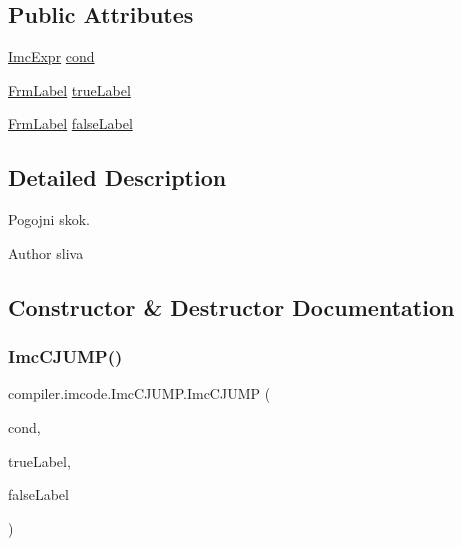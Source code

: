 \subsection*{Public Attributes}
\begin{DoxyCompactItemize}
\item 
\hyperlink{classcompiler_1_1imcode_1_1_imc_expr}{Imc\+Expr} \hyperlink{classcompiler_1_1imcode_1_1_imc_c_j_u_m_p_aa060cb5ff22920eee2e7a16b9252e238}{cond}
\item 
\hyperlink{classcompiler_1_1frames_1_1_frm_label}{Frm\+Label} \hyperlink{classcompiler_1_1imcode_1_1_imc_c_j_u_m_p_afe718affa055b0d5fa58cb5011024adf}{true\+Label}
\item 
\hyperlink{classcompiler_1_1frames_1_1_frm_label}{Frm\+Label} \hyperlink{classcompiler_1_1imcode_1_1_imc_c_j_u_m_p_acf48b9439d6099fa19f10c96d2852613}{false\+Label}
\end{DoxyCompactItemize}


\subsection{Detailed Description}
Pogojni skok.

\begin{DoxyAuthor}{Author}
sliva 
\end{DoxyAuthor}


\subsection{Constructor \& Destructor Documentation}
\mbox{\label{classcompiler_1_1imcode_1_1_imc_c_j_u_m_p_a118e178659acfad7a782e510e326b694}} 
\subsubsection{\texorpdfstring{Imc\+C\+J\+U\+M\+P()}{ImcCJUMP()}}
{\footnotesize\ttfamily compiler.\+imcode.\+Imc\+C\+J\+U\+M\+P.\+Imc\+C\+J\+U\+MP (\begin{DoxyParamCaption}\item[{\hyperlink{classcompiler_1_1imcode_1_1_imc_expr}{Imc\+Expr}}]{cond,  }\item[{\hyperlink{classcompiler_1_1frames_1_1_frm_label}{Frm\+Label}}]{true\+Label,  }\item[{\hyperlink{classcompiler_1_1frames_1_1_frm_label}{Frm\+Label}}]{false\+Label }\end{DoxyParamCaption})}

